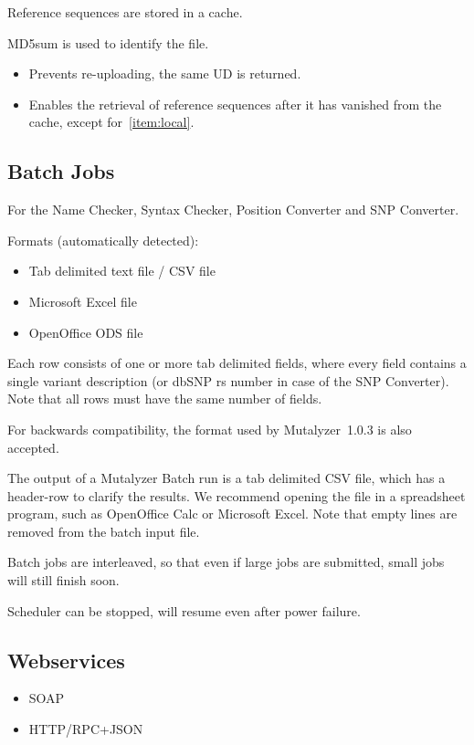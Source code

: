 \documentclass{article}
\begin{document}
Reference sequences are stored in a cache.

MD5sum is used to identify the file.
\begin{itemize}
  \item Prevents re-uploading, the same UD is returned.
  \item Enables the retrieval of reference sequences after it has vanished from
    the cache, except for~\ref{item:local}.
\end{itemize}

\subsection{Batch Jobs}
For the Name Checker, Syntax Checker, Position Converter and SNP Converter.

Formats (automatically detected):
\begin{itemize}
  \item Tab delimited text file / CSV file
  \item Microsoft Excel file
  \item OpenOffice ODS file
\end{itemize}

Each row consists of one or more tab delimited fields, where every field
contains a single variant description (or dbSNP rs number in case of the SNP
Converter). Note that all rows must have the same number of fields.

For backwards compatibility, the format used by Mutalyzer~1.0.3 is also
accepted.

The output of a Mutalyzer Batch run is a tab delimited CSV file, which has a
header-row to clarify the results. We recommend opening the file in a
spreadsheet program, such as OpenOffice Calc or Microsoft Excel. Note that
empty lines are removed from the batch input file.

Batch jobs are interleaved, so that even if large jobs are submitted, small
jobs will still finish soon.

Scheduler can be stopped, will resume even after power failure.

\subsection{Webservices}
\begin{itemize}
  \item SOAP
  \item HTTP/RPC+JSON
\end{itemize}
\end{document}
